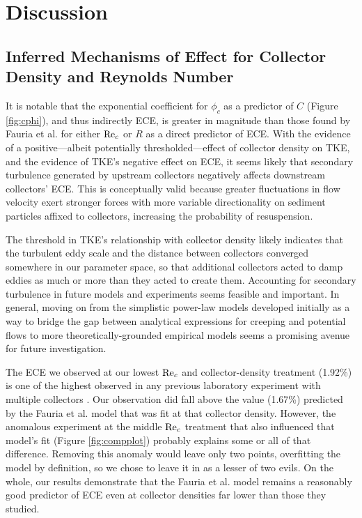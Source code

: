 \documentclass[geosciences,article,submit,moreauthors,pdftex]{Definitions/mdpi}
\begin{document}
\section{Discussion}

\subsection{Inferred Mechanisms of Effect for Collector Density and Reynolds Number}

It is notable that the exponential coefficient for $\phi_c$ as a predictor of $C$ (Figure \ref{fig:cphi}), and thus indirectly ECE, is greater in magnitude than those found by Fauria et al. \cite{Fauria_2015} for either $\mathrm{Re}_c$ or $R$ as a direct predictor of ECE. With the evidence of a positive---albeit potentially thresholded---effect of collector density on TKE, and the evidence of TKE's negative effect on ECE, it seems likely that secondary turbulence generated by upstream collectors negatively affects downstream collectors' ECE. This is conceptually valid because greater fluctuations in flow velocity exert stronger forces with more variable directionality on sediment particles affixed to collectors, increasing the probability of resuspension. 

The threshold in TKE's relationship with collector density likely indicates that the turbulent eddy scale and the distance between collectors converged somewhere in our parameter space, so that additional collectors acted to damp eddies as much or more than they acted to create them. Accounting for secondary turbulence in future models and experiments seems feasible and important. In general, moving on from the simplistic power-law models developed initially as a way to bridge the gap between analytical expressions for creeping and potential flows to more theoretically-grounded empirical models \cite{stein2020} seems a promising avenue for future investigation.

The ECE we observed at our lowest $\mathrm{Re}_c$ and collector-density treatment (1.92\%) is one of the highest observed in any previous laboratory experiment with multiple collectors \cite{stein2020}. Our observation did fall above the value (1.67\%) predicted by the Fauria et al. model \cite{Fauria_2015} that was fit at that collector density. However, the anomalous experiment at the middle $\mathrm{Re}_c$ treatment that also influenced that model's fit (Figure \ref{fig:compplot}) probably explains some or all of that difference. Removing this anomaly would leave only two points, overfitting the model by definition, so we chose to leave it in as a lesser of two evils. On the whole, our results demonstrate that the Fauria et al. model remains a reasonably good predictor of ECE even at collector densities far lower than those they studied.
\end{document}
